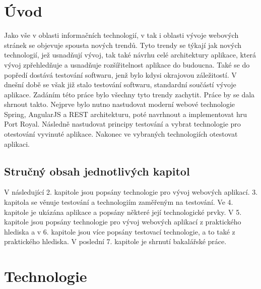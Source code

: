 \documentclass[czech,master,public,dept460,male,cpdeclaration,twoside]{diploma}
\begin{document}
\MakeTitlePages

\lstlistoflistings

\section{Úvod}
Jako vše v oblasti informačních technologií, v tak i oblasti vývoje webových stránek se objevuje spousta nových trendů. Tyto trendy se týkají jak nových technologií, jež usnadňují vývoj, tak také návrhu celé architektury aplikace, která vývoj zpřehledňuje a usnadňuje rozšířitelnost aplikace do budoucna. Také se do popředí dostává testování softwaru, jenž bylo kdysi okrajovou záležitostí. V dnešní době se však již stalo testování softwaru, standardní součástí vývoje aplikace. Zadáním této práce bylo všechny tyto trendy zachytit. Práce by se dala shrnout takto. Nejprve bylo nutno nastudovat moderní webové technologie Spring, AngularJS a REST architekturu, poté navrhnout a implementovat hru Port Royal. Následně nastudovat principy testování a vybrat technologie pro otestování vyvinuté aplikace. Nakonec ve vybraných technologiích otestovat aplikaci.


\subsection{Stručný obsah jednotlivých kapitol}
V následující 2. kapitole jsou popsány technologie pro vývoj webových aplikací. 3. kapitola se věnuje testování a technologiím zaměřeným na testování. Ve 4. kapitole je ukázána aplikace a popsány některé její technologické prvky. V 5. kapitole jsou popsány technologie pro vývoj webových aplikací z praktického hlediska a v 6. kapitole jsou více popsány testovací technologie, a to také z praktického hlediska. V poslední 7. kapitole je shrnutí bakalářské práce.

\section{Technologie}
\end{document}
